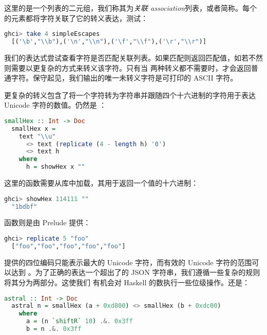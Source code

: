 \documentclass[./main.tex]{subfiles}
\begin{document}
这里的是一个列表的二元组，我们称其为\textit{关联 association}列表，或者简称。每个
的元素都将字符关联了它的转义表达，测试：

\begin{lstlisting}[language=Haskell]
  ghci> take 4 simpleEscapes
  [('\b',"\\b"),('\n',"\\n"),('\f',"\\f"),('\r',"\\r")]
\end{lstlisting}

我们的表达式尝试查看字符是否匹配关联列表。如果匹配则返回匹配值，如若不然则需要以更复杂的方式来转义该字符。只有当
两种转义都不需要时，才会返回普通字符。保守起见，我们输出的唯一未转义字符是可打印的 ASCII 字符。

更复杂的转义包含了将一个字符转为字符串并跟随四个十六进制的字符用于表达 Unicode 字符的数值。仍然是
：

\begin{lstlisting}[language=Haskell]
  smallHex :: Int -> Doc
  smallHex x =
    text "\\u"
      <> text (replicate (4 - length h) '0')
      <> text h
    where
      h = showHex x ""
\end{lstlisting}

这里的函数需要从库中加载，其用于返回一个值的十六进制：

\begin{lstlisting}[language=Haskell]
  ghci> showHex 114111 ""
  "1bdbf"
\end{lstlisting}

函数则是由 Prelude 提供：

\begin{lstlisting}[language=Haskell]
  ghci> replicate 5 "foo"
  ["foo","foo","foo","foo","foo"]
\end{lstlisting}

提供的四位编码只能表示最大的 Unicode 字符，而有效的 Unicode 字符的范围可以达到
。为了正确的表达一个超出了的 JSON 字符串，我们遵循一些复杂的规则将其分为两部分。这使我们
有机会对 Haskell 的数执行一些位级操作。还是：

\begin{lstlisting}[language=Haskell]
  astral :: Int -> Doc
  astral n = smallHex (a + 0xd800) <> smallHex (b + 0xdc00)
    where
      a = (n `shiftR` 10) .&. 0x3ff
      b = n .&. 0x3ff
\end{lstlisting}
\end{document}
